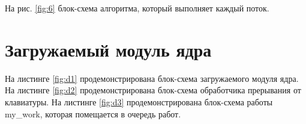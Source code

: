 На рис. \ref{fig:6} блок-схема алгоритма, который выполняет каждый поток. 

\begin{figure}[ht!]
\end{figure}

\newpage

\section{Загружаемый модуль ядра}

На листинге \ref{fig:d1} продемонстрирована блок-схема загружаемого модуля ядра.
На листинге \ref{fig:d2} продемонстрирована блок-схема обработчика прерывания от клавиатуры.
На листинге \ref{fig:d3} продемонстрирована блок-схема работы my\_work, которая помещается в очередь работ.

\newpage

